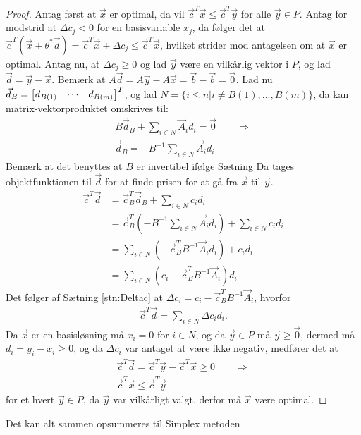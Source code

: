 \begin{proof}
Antag først at $\vec{x}$ er optimal, da vil $\vec{c}^T\vec{x} \leq \vec{c}^T\vec{y}$ for alle $\vec{y} \in P$. 
Antag for modstrid at $\Delta c_j < 0$ for en basisvariable $x_j$, da følger det at $\vec{c}^T(\vec{x}+\theta^*\vec{d}) = \vec{c}^T\vec{x} + \Delta c_j \leq \vec{c}^T\vec{x}$, hvilket strider mod antagelsen om at $\vec{x}$ er optimal.
Antag nu, at $\Delta c_j \geq 0$ og lad $\vec{y}$ være en vilkårlig vektor i $P$, og lad $\vec{d}=\vec{y}-\vec{x}$.
Bemærk at $A\vec{d} = A\vec{y}- A\vec{x} =  \vec{b} - \vec{b} =\vec{0}$.
Lad nu $\vec{d}_B = \begin{bmatrix} d_{B(1)} & \cdots & d_{B(m)} \end{bmatrix}^T$, og lad $N= \{i \leq n| i \neq B(1),...,B(m)\}$, da kan matrix-vektorproduktet omskrives til:
\begin{align*}
	B\vec{d}_B + \sum_{i \in N} \vec{A}_i d_i = \vec{0} \qquad \Rightarrow
	\\ \vec{d}_B = - B^{-1}\sum_{i \in N} \vec{A}_i d_i
\end{align*}
Bemærk at det benyttes at $B$ er invertibel ifølge Sætning %
Da tages objektfunktionen til $\vec{d}$ for at finde prisen for at gå fra $\vec{x}$ til $\vec{y}$.
\begin{align*}
 \vec{c}^T\vec{d} &= \vec{c}_B^T\vec{d}_B + \sum_{i \in N} c_i d_i 
 \\&= \vec{c}_B^T(- B^{-1}\sum_{i \in N} \vec{A}_i d_i) + \sum_{i \in N} c_i d_i  
 \\&= \sum_{i \in N} (- \vec{c}_B^T B^{-1} \vec{A}_i d_i) +  c_i d_i 
 \\&= \sum_{i \in N} ( c_i - \vec{c}_B^TB^{-1}\vec{A}_i ) d_i
\end{align*}
Det følger af Sætning \ref{stn:Deltac} at $\Delta c_i = c_i - \vec{c}_B^TB^{-1}\vec{A}_i $, hvorfor
\begin{align*}
\vec{c}^T\vec{d} = \sum_{i \in N} \Delta c_i d_i.
\end{align*}
Da $\vec{x}$ er en basisløsning må $x_i = 0$ for $i \in N$, og da $\vec{y} \in P$ må $\vec{y} \geq \vec{0}$, dermed må $d_i = y_i - x_i \geq 0$, og da $\Delta c_i$ var antaget at være ikke negativ, medfører det at
\begin{align*}
\vec{c}^T\vec{d} = \vec{c}^T\vec{y}-\vec{c}^T\vec{x} \geq 0 \qquad \Rightarrow
\\ \vec{c}^T\vec{x} \leq \vec{c}^T\vec{y}
\end{align*}
for et hvert $\vec{y} \in P$, da $\vec{y}$ var vilkårligt valgt, derfor må $\vec{x}$ være optimal.
\end{proof}
Det kan alt sammen opsummeres til Simplex metoden

